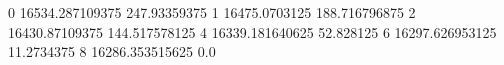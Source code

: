 0 16534.287109375 247.93359375
1 16475.0703125 188.716796875
2 16430.87109375 144.517578125
4 16339.181640625 52.828125
6 16297.626953125 11.2734375
8 16286.353515625 0.0
